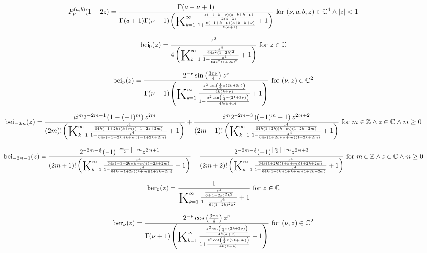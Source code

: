 \documentclass{article}
\newcommand{\bigK}{\mathop{\raisebox{-5pt}{\huge K}}}
\begin{document}
\[P_{\nu }^{(a,b)}(1-2 z)=\frac{\Gamma (a+\nu +1)}{\Gamma (a+1) \Gamma (\nu +1) \left(\bigK_{k=1}^{\infty}\frac{-\frac{z (-1+k-\nu ) (a+b+k+\nu )}{k (a+k)}}{1+\frac{z (-1+k-\nu ) (a+b+k+\nu )}{k (a+k)}}+1\right)}\text{ for }(\nu ,a,b,z)\in \mathbb{C}^4\land \left| z\right| <1\] 

\[\text{bei}_0(z)=\frac{z^2}{4 \left(\bigK_{k=1}^{\infty}\frac{\frac{z^4}{64 k^2 (1+2 k)^2}}{1-\frac{z^4}{64 k^2 (1+2 k)^2}}+1\right)}\text{ for }z\in \mathbb{C}\] 

\[\text{bei}_{\nu }(z)=\frac{2^{-\nu } \sin \left(\frac{3 \pi  \nu }{4}\right) z^{\nu }}{\Gamma (\nu +1) \left(\bigK_{k=1}^{\infty}\frac{\frac{z^2 \tan \left(\frac{1}{4} \pi  (2 k+3 \nu )\right)}{4 k (k+\nu )}}{1-\frac{z^2 \tan \left(\frac{1}{4} \pi  (2 k+3 \nu )\right)}{4 k (k+\nu )}}+1\right)}\text{ for }(\nu ,z)\in \mathbb{C}^2\] 

\[\text{bei}_{-2 m}(z)=\frac{i i^m 2^{-2 m-1} \left(1-(-1)^m\right) z^{2 m}}{(2 m)! \left(\bigK_{k=1}^{\infty}\frac{\frac{z^4}{64 k (-1+2 k) (k+m) (-1+2 k+2 m)}}{1-\frac{z^4}{64 k (-1+2 k) (k+m) (-1+2 k+2 m)}}+1\right)}+\frac{i^m 2^{-2 m-3} \left((-1)^m+1\right) z^{2 m+2}}{(2 m+1)! \left(\bigK_{k=1}^{\infty}\frac{\frac{z^4}{64 k (1+2 k) (k+m) (1+2 k+2 m)}}{1-\frac{z^4}{64 k (1+2 k) (k+m) (1+2 k+2 m)}}+1\right)}\text{ for }m\in \mathbb{Z}\land z\in \mathbb{C}\land m\geq 0\] 

\[\text{bei}_{-2 m-1}(z)=\frac{2^{-2 m-\frac{3}{2}} (-1)^{\left\lfloor \frac{m-1}{2}\right\rfloor +m} z^{2 m+1}}{(2 m+1)! \left(\bigK_{k=1}^{\infty}\frac{\frac{z^4}{64 k (-1+2 k) (k+m) (1+2 k+2 m)}}{1-\frac{z^4}{64 k (-1+2 k) (k+m) (1+2 k+2 m)}}+1\right)}+\frac{2^{-2 m-\frac{7}{2}} (-1)^{\left\lfloor \frac{m}{2}\right\rfloor +m} z^{2 m+3}}{(2 m+2)! \left(\bigK_{k=1}^{\infty}\frac{\frac{z^4}{64 k (1+2 k) (1+k+m) (1+2 k+2 m)}}{1-\frac{z^4}{64 k (1+2 k) (1+k+m) (1+2 k+2 m)}}+1\right)}\text{ for }m\in \mathbb{Z}\land z\in \mathbb{C}\land m\geq 0\] 

\[\text{ber}_0(z)=\frac{1}{\bigK_{k=1}^{\infty}\frac{\frac{z^4}{64 (1-2 k)^2 k^2}}{1-\frac{z^4}{64 (1-2 k)^2 k^2}}+1}\text{ for }z\in \mathbb{C}\] 

\[\text{ber}_{\nu }(z)=\frac{2^{-\nu } \cos \left(\frac{3 \pi  \nu }{4}\right) z^{\nu }}{\Gamma (\nu +1) \left(\bigK_{k=1}^{\infty}\frac{-\frac{z^2 \cot \left(\frac{1}{4} \pi  (2 k+3 \nu )\right)}{4 k (k+\nu )}}{1+\frac{z^2 \cot \left(\frac{1}{4} \pi  (2 k+3 \nu )\right)}{4 k (k+\nu )}}+1\right)}\text{ for }(\nu ,z)\in \mathbb{C}^2\] 
\end{document}
